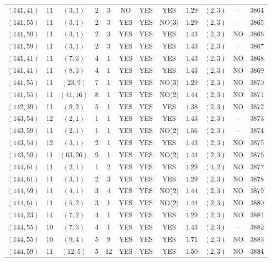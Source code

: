 \begin{longtable}{|c|c|c|c|c|c|c|c|c|c|c|c|}
$(141,41)$ & 11 & $(3,1)$ & 2 & 3 & NO & YES & YES & $1.29$ & $(2,3)$ & -- & 3864\\
$(141,55)$ & 11 & $(3,1)$ & 2 & 3 & YES & YES & NO(3) & $1.29$ & $(2,3)$ & -- & 3865\\
$(141,59)$ & 11 & $(3,1)$ & 2 & 3 & YES & YES & YES & $1.43$ & $(2,3)$ & NO & 3866\\
$(141,59)$ & 11 & $(3,1)$ & 2 & 3 & YES & YES & YES & $1.43$ & $(2,3)$ & -- & 3867\\
$(141,41)$ & 11 & $(7,3)$ & 4 & 1 & YES & YES & YES & $1.43$ & $(2,3)$ & NO & 3868\\
$(141,41)$ & 11 & $(8,3)$ & 4 & 1 & YES & YES & YES & $1.43$ & $(2,3)$ & NO & 3869\\
$(141,55)$ & 11 & $(23,9)$ & 7 & 1 & YES & YES & NO(3) & $1.29$ & $(2,3)$ & NO & 3870\\
$(141,55)$ & 11 & $(41,16)$ & 8 & 1 & YES & YES & NO(2) & $1.44$ & $(2,3)$ & NO & 3871\\
$(142,39)$ & 11 & $(9,2)$ & 5 & 1 & YES & YES & YES & $1.38$ & $(2,3)$ & NO & 3872\\
$(143,54)$ & 12 & $(2,1)$ & 1 & 1 & YES & YES & YES & $1.43$ & $(2,3)$ & -- & 3873\\
$(143,59)$ & 11 & $(2,1)$ & 1 & 1 & YES & YES & NO(2) & $1.56$ & $(2,3)$ & -- & 3874\\
$(143,54)$ & 12 & $(3,1)$ & 2 & 1 & YES & YES & YES & $1.43$ & $(2,3)$ & NO & 3875\\
$(143,59)$ & 11 & $(63,26)$ & 9 & 1 & YES & YES & NO(2) & $1.44$ & $(2,3)$ & NO & 3876\\
$(144,61)$ & 11 & $(2,1)$ & 1 & 2 & YES & YES & YES & $1.29$ & $(4,2)$ & NO & 3877\\
$(144,61)$ & 11 & $(3,1)$ & 2 & 3 & YES & YES & YES & $1.29$ & $(2,3)$ & NO & 3878\\
$(144,59)$ & 11 & $(4,1)$ & 3 & 4 & YES & YES & NO(2) & $1.44$ & $(2,3)$ & NO & 3879\\
$(144,61)$ & 11 & $(5,2)$ & 3 & 1 & YES & YES & NO(2) & $1.44$ & $(2,3)$ & NO & 3880\\
$(144,23)$ & 14 & $(7,2)$ & 4 & 1 & YES & YES & YES & $1.29$ & $(2,3)$ & NO & 3881\\
$(144,55)$ & 10 & $(7,3)$ & 4 & 1 & YES & YES & YES & $1.43$ & $(2,3)$ & -- & 3882\\
$(144,55)$ & 10 & $(9,4)$ & 5 & 9 & YES & YES & YES & $1.71$ & $(2,3)$ & NO & 3883\\
$(144,59)$ & 11 & $(12,5)$ & 5 & 12 & YES & YES & YES & $1.50$ & $(2,3)$ & NO & 3884\\

\end{longtable}
